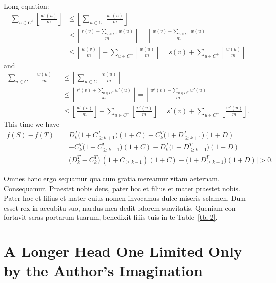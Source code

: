 \documentclass{bln}
\begin{document}
Long equation:
%
\begin{align}
\sum_{u\in C^+}\left\lfloor{\frac{w'(u)}{m}} \right\rfloor 
    & \le \left\lfloor\sum_{u\in C^+} {\frac{w'(u)}{m}} \right\rfloor \nonumber \\
    & \le \left\lfloor{\frac{r(v)+\sum_{u\in C^+} w(u)}{m}} \right \rfloor = \left\lfloor{\frac{w(v)-\sum_{u\in C^-} w(u)}{m}} \right \rfloor \nonumber \\
    & \le \left\lfloor{\frac{w(v)}{m}} \right\rfloor -\sum_{u\in C^-}\left\lfloor{\frac{w(u)}{m}} \right\rfloor = s(v)+\sum_{u\in C^+}\left\lfloor{\frac{w(u)}{m}} \right\rfloor
\end{align}
%
and
%
\begin{align}
\sum_{u\in C^-}\left\lfloor{\frac{w(u)}{m}} \right\rfloor
    & \le \left\lfloor\sum_{u\in C^-} {\frac{w(u)}{m}} \right\rfloor \nonumber \\
    & \le \left\lfloor{\frac{r'(v)+\sum_{u\in C^-} w'(u)}{m}} \right \rfloor = \left\lfloor{\frac{w'(v)-\sum_{u\in C^+} w'(u)}{m}} \right\rfloor \nonumber\\
    & \le \left\lfloor{\frac{w'(v)}{m}} \right\rfloor -\sum_{u\in C^+}\left\lfloor{\frac{w'(u)}{m}} \right\rfloor = s'(v)+\sum _{u\in C^-}\left\lfloor{\frac{w'(u)}{m}} \right\rfloor .
\end{align}
%
This time we have
%
\begin{align}
f(S)-f(T) = {} & D_k^T\bigl(1+C_{\geq k+1}^T\bigr)(1 + C) + C_k^T\bigl(1+D_{\geq k+1}^T\bigr)(1 + D) \nonumber    \\
            {} & - C_k^T\bigl(1+C_{\geq k+1}^T\bigr)(1 + C) - D_k^T\bigl (1+D_{\geq k+1}^T\bigr)(1 + D) \nonumber \\
          = {} & \bigl(D_k^T-C_k^T\bigr)\bigl[(1+C_{\geq k+1})(1+C)-\bigl (1+D_{\geq k+1}^T\bigr)(1+D)\bigr]>0.
\end{align}

Omnes hanc ergo sequamur qua cum gratia mereamur vitam aeternam.
Consequamur. Praestet nobis deus, pater hoc et filius et mater
praestet nobis.  Pater hoc et filius et mater cuius nomen invocamus
dulce miseris solamen. Dum esset rex in accubitu suo, nardus mea
dedit odorem suavitatis. Quoniam con-fortavit seras portarum tuarum,
benedixit filiis tuis in te Table~\ref{tbl-2}.



\section{A Longer Head One Limited Only by the Author's Imagination}
\end{document}
